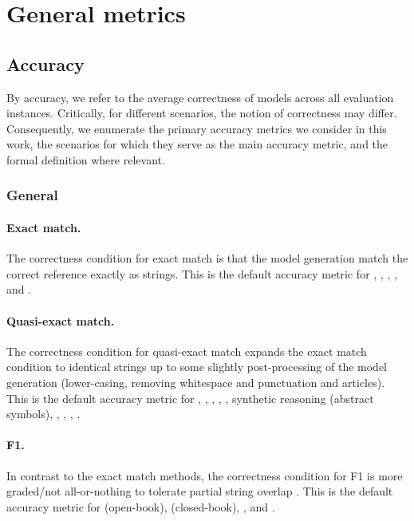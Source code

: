 \section{General metrics}
\label{app:metrics}
\subsection{Accuracy}
\label{app:metrics-accuracy}
By accuracy, we refer to the average correctness of models across all evaluation instances.
Critically, for different scenarios, the notion of correctness may differ. 
Consequently, we enumerate the primary accuracy metrics we consider in this work, the scenarios for which they serve as the main accuracy metric, and the formal definition where relevant.

\subsubsection{General}

\paragraph{Exact match.}
The correctness condition for exact match is that the model generation match the correct reference exactly as strings. 
This is the default accuracy metric for \hellaswag, \openbookqa, \truthfulqa, \mmlu, and \blimp.

\paragraph{Quasi-exact match.} 
The correctness condition for quasi-exact match expands the exact match condition to identical strings up to some slightly post-processing of the model generation (\ie lower-casing, removing whitespace and punctuation and articles).
This is the default accuracy metric for \boolq, \imdb, \civilcomments, \raft, \wikifact, synthetic reasoning (abstract symbols), \babi \legalsupport, \lsat, \entmatch, \dataimp.

\paragraph{F1.} 
In contrast to the exact match methods, the correctness condition for F1 is more graded/not all-or-nothing to tolerate partial string overlap \citep[see][]{rajpurkar2016squad}. 
This is the default accuracy metric for \naturalquestions (open-book), \naturalquestions (closed-book), \narrativeqa, and \quac. 

